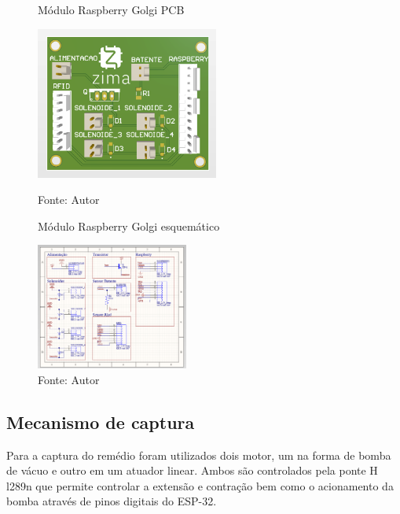 \documentclass[../poliXuniversity_hospital_(USP)_report.tex]{subfiles}
\begin{document}
\begin{figure}[h]
\centering
    \begin{minipage}{0.5\textwidth}
        \centering
        \caption{Módulo Raspberry Golgi PCB}
        \centering %
        \includegraphics[width=6cm]{images/PCB_rasp.png}
        \caption*{Fonte: Autor}
        \label{figura: Módulo Raspberry Golgi PCB}
        
    \end{minipage}\hfill
    \begin{minipage}{0.5\textwidth}
    
        \centering
        \caption{Módulo Raspberry Golgi esquemático}
        \centering %
        \includegraphics[width=5cm]{images/esqueqmatico_pcb_rasp.png}
        \caption*{Fonte: Autor}
        \label{figura: Módulo Raspberry Golgi esquemático}
        
    \end{minipage}\hfill
\end{figure}

\subsection{Mecanismo de captura}

Para a captura do remédio foram utilizados dois motor, um na forma de bomba de vácuo e outro em um atuador linear. Ambos são controlados pela ponte H l289n que permite controlar a extensão e contração bem como o acionamento da bomba através de pinos digitais do ESP-32.
\end{document}
